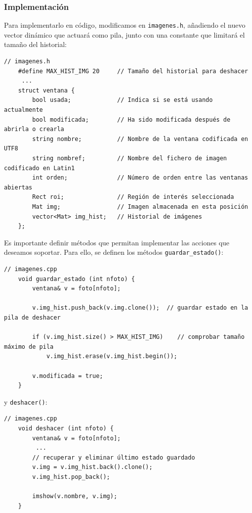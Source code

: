 \documentclass[11pt]{article}
\begin{document}
      \subsubsection{Implementación}

          Para implementarlo en código, modificamos en \texttt{imagenes.h}, añadiendo el
          nuevo vector dinámico que actuará como pila, junto con una constante que
          limitará el tamaño del historial:

          \begin{lstlisting}[style=CppQtStyle, caption={Estructura \texttt{ventana}: adición de \texttt{img\_hist} y constante \texttt{MAX\_HIST\_IMG}.}]
    // imagenes.h
    #define MAX_HIST_IMG 20     // Tamaño del historial para deshacer
     ...
    struct ventana {
        bool usada;             // Indica si se está usando actualmente
        bool modificada;        // Ha sido modificada después de abrirla o crearla
        string nombre;          // Nombre de la ventana codificada en UTF8
        string nombref;         // Nombre del fichero de imagen codificado en Latin1
        int orden;              // Número de orden entre las ventanas abiertas
        Rect roi;               // Región de interés seleccionada
        Mat img;                // Imagen almacenada en esta posición
        vector<Mat> img_hist;   // Historial de imágenes
    };
\end{lstlisting}

          \clearpage

          Es importante definir métodos que permitan implementar las acciones que
          deseamos soportar. Para ello, se definen los métodos
          \texttt{guardar\_estado()}:

          \begin{lstlisting}[style=CppQtStyle]
    // imagenes.cpp
    void guardar_estado (int nfoto) {
        ventana& v = foto[nfoto];

        v.img_hist.push_back(v.img.clone());  // guardar estado en la pila de deshacer

        if (v.img_hist.size() > MAX_HIST_IMG)    // comprobar tamaño máximo de pila
            v.img_hist.erase(v.img_hist.begin());

        v.modificada = true;
    }
\end{lstlisting}

          \noindent
          y \texttt{deshacer()}:

          \begin{lstlisting}[style=CppQtStyle]
    // imagenes.cpp
    void deshacer (int nfoto) {
        ventana& v = foto[nfoto];
         ...
        // recuperar y eliminar último estado guardado
        v.img = v.img_hist.back().clone();
        v.img_hist.pop_back();

        imshow(v.nombre, v.img);
    }
\end{lstlisting}
\end{document}
